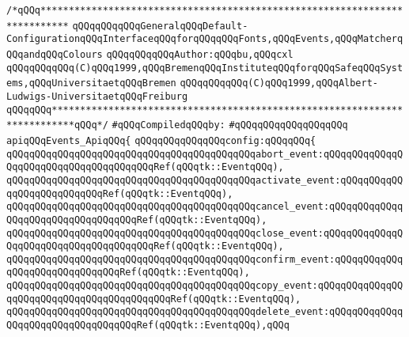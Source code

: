\label{src/lib/tk/src/global_config.pkg}
\verb|/*qQQq***************************************************************************|\newline
\verb|qQQqqQQqqQQqGeneralqQQqDefault-ConfigurationqQQqInterfaceqQQqforqQQqqQQqFonts,qQQqEvents,qQQqMatcherqQQqandqQQqColours|\newline
\verb|qQQqqQQqqQQqAuthor:qQQqbu,qQQqcxl|\newline
\verb|qQQqqQQqqQQq(C)qQQq1999,qQQqBremenqQQqInstituteqQQqforqQQqSafeqQQqSystems,qQQqUniversitaetqQQqBremen|\newline
\verb|qQQqqQQqqQQq(C)qQQq1999,qQQqAlbert-Ludwigs-UniversitaetqQQqFreiburg|\newline
\verb|qQQqqQQq**************************************************************************qQQq*/|\newline
\newline
\verb|#qQQqCompiledqQQqby:|\newline
\verb|#qQQqqQQqqQQqqQQqqQQq|\newline
\newline
\verb|apiqQQqEvents_ApiqQQq{|\newline
\newline
\verb|qQQqqQQqqQQqqQQqconfig:qQQqqQQq{|\newline
\verb|qQQqqQQqqQQqqQQqqQQqqQQqqQQqqQQqqQQqqQQqqQQqabort_event:qQQqqQQqqQQqqQQqqQQqqQQqqQQqqQQqqQQqqQQqRef(qQQqtk::EventqQQq),|\newline
\verb|qQQqqQQqqQQqqQQqqQQqqQQqqQQqqQQqqQQqqQQqqQQqactivate_event:qQQqqQQqqQQqqQQqqQQqqQQqqQQqRef(qQQqtk::EventqQQq),|\newline
\verb|qQQqqQQqqQQqqQQqqQQqqQQqqQQqqQQqqQQqqQQqqQQqcancel_event:qQQqqQQqqQQqqQQqqQQqqQQqqQQqqQQqqQQqRef(qQQqtk::EventqQQq),|\newline
\verb|qQQqqQQqqQQqqQQqqQQqqQQqqQQqqQQqqQQqqQQqqQQqclose_event:qQQqqQQqqQQqqQQqqQQqqQQqqQQqqQQqqQQqqQQqRef(qQQqtk::EventqQQq),|\newline
\verb|qQQqqQQqqQQqqQQqqQQqqQQqqQQqqQQqqQQqqQQqqQQqconfirm_event:qQQqqQQqqQQqqQQqqQQqqQQqqQQqqQQqRef(qQQqtk::EventqQQq),|\newline
\verb|qQQqqQQqqQQqqQQqqQQqqQQqqQQqqQQqqQQqqQQqqQQqcopy_event:qQQqqQQqqQQqqQQqqQQqqQQqqQQqqQQqqQQqqQQqqQQqRef(qQQqtk::EventqQQq),|\newline
\verb|qQQqqQQqqQQqqQQqqQQqqQQqqQQqqQQqqQQqqQQqqQQqdelete_event:qQQqqQQqqQQqqQQqqQQqqQQqqQQqqQQqqQQqRef(qQQqtk::EventqQQq),qQQq|\newline
